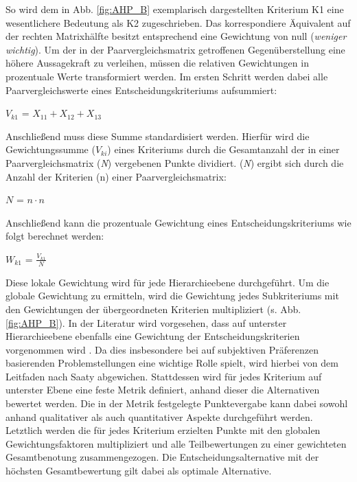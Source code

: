 \vspace*{-10mm}
So wird dem in Abb. \ref*{fig:AHP_B} exemplarisch dargestellten Kriterium K1 eine wesentlichere Bedeutung als K2 zugeschrieben. Das korrespondiere Äquivalent auf der rechten Matrixhälfte besitzt entsprechend eine Gewichtung von null (\textit{weniger wichtig}). Um der in der Paarvergleichsmatrix getroffenen Gegenüberstellung eine höhere Aussagekraft zu verleihen, müssen die relativen Gewichtungen in prozentuale Werte transformiert werden. Im ersten Schritt werden dabei alle Paarvergleichswerte eines Entscheidungskriteriums aufsummiert:\\
 \vspace{-6mm}
 \begin{center}
	$V_{k1}$ = $X_{11}+X_{12}+X_{13}$	
 \end{center}
Anschließend muss diese Summe standardisiert werden. Hierfür wird die Gewichtungssumme ($V_{ki}$) eines Kriteriums durch die Gesamtanzahl der in einer Paarvergleichsmatrix (\textit{N}) vergebenen Punkte dividiert. (\textit{N}) ergibt sich durch die Anzahl der Kriterien (n) einer Paarvergleichsmatrix:
\vspace{-2mm}
\begin{center}
   $N$ = $ n \cdot n $	
\end{center}
Anschließend kann die prozentuale Gewichtung eines Entscheidungskriteriums wie folgt berechnet werden:
 \vspace{-2mm}
 \begin{center}
	$W_{k1}$ = $\frac{V_{k1}}{N}$	
 \end{center}
Diese lokale Gewichtung wird für jede Hierarchieebene durchgeführt. Um die globale Gewichtung zu ermitteln, wird die Gewichtung jedes Subkriteriums mit den Gewichtungen der übergeordneten Kriterien  multipliziert (s. Abb. \ref*{fig:AHP_B}).
In der Literatur wird vorgesehen, dass auf unterster Hierarchieebene ebenfalls eine Gewichtung der Entscheidungskriterien vorgenommen wird \cite[86]{Saaty.2008}. Da dies insbesondere bei auf subjektiven Präferenzen basierenden Problemstellungen eine wichtige Rolle spielt, wird hierbei von dem Leitfaden nach Saaty abgewichen. Stattdessen wird für jedes Kriterium auf unterster Ebene eine feste Metrik definiert, anhand dieser die Alternativen bewertet werden. Die in der Metrik festgelegte Punktevergabe kann dabei sowohl anhand qualitativer als auch quantitativer Aspekte durchgeführt werden. Letztlich werden die für jedes Kriterium erzielten Punkte mit den globalen Gewichtungsfaktoren multipliziert und alle Teilbewertungen zu einer gewichteten Gesamtbenotung zusammengezogen. Die Entscheidungsalternative mit der höchsten Gesamtbewertung gilt dabei als optimale Alternative. 
